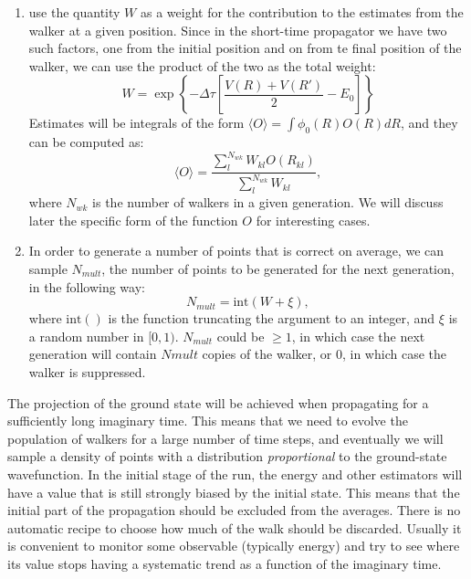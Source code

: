 \begin{enumerate}
	\item
	use the quantity $W$ as a weight for the contribution to the estimates from the walker at a given position. Since in the short-time propagator we have two such factors, one from the initial position and on from te final position of the walker, we can use the product of the two as the total weight:
	\begin{equation}
	\label{eq:propw}
	W=\exp\left\{ -\Delta\tau\left[\frac{V(R)+V(R')}{2}-E_0\right]\right\}
	\end{equation}
	Estimates will be integrals of the form $\langle O\rangle=\int \phi_0(R) O(R) dR$,
	and they can be computed as:
	\begin{equation}
	   \langle O\rangle =\frac{  \sum_l^{N_{wk}}W_{kl}O(R_{kl})}
	   	{\sum_l^{N_{wk}}W_{kl}},\label{dmc_averages}
	\end{equation} 
where $N_{wk}$ is the number of walkers in a given generation. We will discuss later the specific form of the function $O$ for interesting cases.
\item
In order to generate a number of points that is correct on average, we can sample $N_{mult}$, the number of points to be generated for the next generation, in the following way:
\begin{equation}
N_{mult}=\text{int}(W+\xi),
\end{equation}
where $\text{int}()$ is the function truncating the argument to an integer, and $\xi$ is a random number in $[0,1)$. $N_{mult}$ could be $\geq 1$, in which case the next generation will contain
$N{mult}$ copies of the walker, or $0$, in which case the walker is suppressed. 
\end{enumerate}	
The projection of the ground state will be achieved when propagating for a sufficiently long imaginary time. This means that we need to evolve the population of walkers for a large number of time steps, and eventually we will sample a density of points with a distribution {\it proportional} to the ground-state wavefunction. In the initial stage of the run, the energy and other estimators will have a value that is still strongly biased by the initial state. This means that the initial part of the propagation should be excluded from the averages. There is no automatic recipe to choose how much of the walk should be discarded. Usually it is convenient to monitor some observable (typically energy) and try to see where its value stops having a systematic trend as a function of the imaginary time. 

